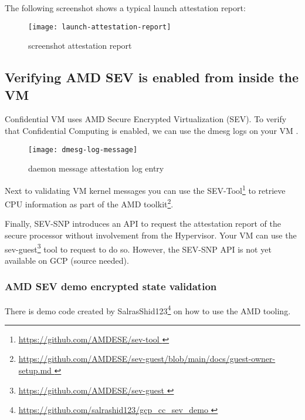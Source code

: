 The following screenshot shows a typical launch attestation report:

\begin{figure}[!ht]
    \centering
    \texttt{[image: launch-attestation-report]}
    \caption{screenshot attestation report}
    \label{fig:launch-attestation-report}
\end{figure}


\subsection{Verifying AMD SEV is enabled from inside the VM }
Confidential VM uses AMD Secure Encrypted Virtualization (SEV). 
To verify that Confidential Computing is enabled, 
we can use the dmesg logs on your VM 
\citep{marsden_using_2019}. 

\begin{figure}[!ht]
    \centering
    \texttt{[image: dmesg-log-message]}
    \caption{daemon message attestation log entry}
    \label{fig:dmesg-log-message}
\end{figure}

Next to validating VM kernel messages you can use the 
SEV-Tool\footnote{\url{https://github.com/AMDESE/sev-tool  }} 
to retrieve CPU information as part of the 
AMD toolkit\footnote{\url{https://github.com/AMDESE/sev-guest/blob/main/docs/guest-owner-setup.md }}.

Finally, 
SEV-SNP introduces an API to request the attestation report 
of the secure processor without involvement from the Hypervisor. 
Your VM can use the sev-guest\footnote{\url{https://github.com/AMDESE/sev-guest }} 
tool to request to do so. 
However, the SEV-SNP API is not yet available on GCP (source needed).

\subsubsection{AMD SEV demo encrypted state validation}
There is demo code created by SalrasShid123\footnote{\url{https://github.com/salrashid123/gcp_cc_sev_demo }} on how to use the AMD tooling. 